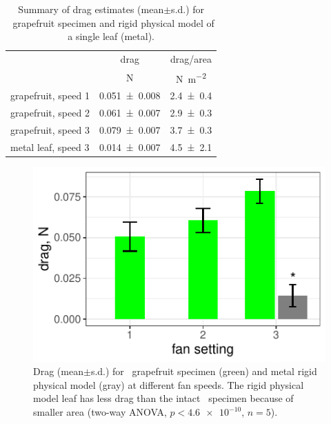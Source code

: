 \begin{table}
\caption{Summary of drag estimates (mean$\pm$s.d.) for \Cxparadisi\ grapefruit specimen and rigid physical model of a single leaf (metal).}
\label{tab:results:drag}
\begin{center}
\begin{tabular}{lcc} %
\toprule
& drag & drag/area \\
& \si{\newton} & \si{\newton\per\meter\squared} \\
\midrule
grapefruit, speed 1 & \num{0.051\pm0.008} & \num{2.4\pm0.4} \\
grapefruit, speed 2 & \num{0.061\pm0.007} & \num{2.9\pm0.3} \\
grapefruit, speed 3 & \num{0.079\pm0.007} & \num{3.7\pm0.3} \\
metal leaf, speed 3 & \num{0.014\pm0.007} & \num{4.5\pm2.1} \\
\bottomrule
\end{tabular}
\end{center}
\end{table}

\clearpage
\begin{figure}[p]
\begin{center}
\includegraphics{data/results1.pdf}
%
\end{center}
\caption{Drag (mean$\pm$s.d.) for \Cxparadisi\ grapefruit specimen (green) and metal rigid physical model (gray) at different fan speeds. The rigid physical model leaf has less drag than the intact \Cxparadisi\ specimen because of smaller area (two-way ANOVA, $p<\num{4.6e-10}$, $n=5$).}
\label{fig:results:drag}
\end{figure}

